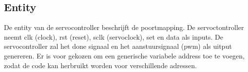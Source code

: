 \subsection{Entity}
De entity van de servocontroller beschrijft de poortmapping. De servoctontroller neemt clk (clock), rst (reset), sclk (servoclock), set en data als inputs. De servocontroller zal het done signaal en het aanstuursignaal (pwm) als uitput genereren. Er is voor gekozen om een generische variabele address toe te voegen, zodat de code kan herbruikt worden voor verschillende adressen.
